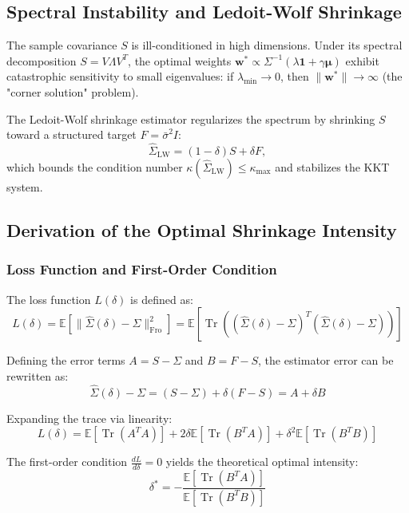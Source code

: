 \documentclass[11pt,a4paper]{article}
\begin{document}
\subsection{Spectral Instability and Ledoit-Wolf Shrinkage}
The sample covariance $S$ is ill-conditioned in high dimensions. Under its spectral decomposition $S = V \Lambda V^T$, the optimal weights $\mathbf{w}^* \propto \Sigma^{-1}(\lambda \mathbf{1} + \gamma \bm{\mu})$ exhibit catastrophic sensitivity to small eigenvalues: if $\lambda_{\min} \to 0$, then $\|\mathbf{w}^*\| \to \infty$ (the "corner solution" problem).

The Ledoit-Wolf shrinkage estimator regularizes the spectrum by shrinking $S$ toward a structured target $F = \bar{\sigma}^2 I$:
\begin{equation}
\hat{\Sigma}_{\text{LW}} = (1 - \delta) S + \delta F,
\end{equation}
which bounds the condition number $\kappa(\hat{\Sigma}_{\text{LW}}) \leq \kappa_{\max}$ and stabilizes the KKT system. 

\subsection{Derivation of the Optimal Shrinkage Intensity}

\subsubsection{Loss Function and First-Order Condition}
The loss function $L(\delta)$ is defined as:
\begin{equation}
L(\delta) = \mathbb{E}[\|\hat{\Sigma}(\delta) - \Sigma\|^2_{\text{Fro}}] = \mathbb{E}[\operatorname{Tr}((\hat{\Sigma}(\delta) - \Sigma)^T (\hat{\Sigma}(\delta) - \Sigma))]
\end{equation}

Defining the error terms $A = S - \Sigma$ and $B = F - S$, the estimator error can be rewritten as:
\begin{equation}
\hat{\Sigma}(\delta) - \Sigma = (S - \Sigma) + \delta(F - S) = A + \delta B
\end{equation}

Expanding the trace via linearity:
\begin{equation}
L(\delta) = \mathbb{E}[\operatorname{Tr}(A^T A)] + 2\delta \mathbb{E}[\operatorname{Tr}(B^T A)] + \delta^2 \mathbb{E}[\operatorname{Tr}(B^T B)]
\end{equation}

The first-order condition $\frac{dL}{d\delta} = 0$ yields the theoretical optimal intensity:
\begin{equation}
\delta^* = -\frac{\mathbb{E}[\operatorname{Tr}(B^T A)]}{\mathbb{E}[\operatorname{Tr}(B^T B)]}
\end{equation}
\end{document}

